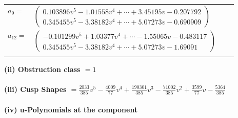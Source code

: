 \documentclass[1p]{elsarticle_modified}
\theoremstyle{definition}
\begin{document}
\begin{tabular}{m{7pt} m{180pt} m{7pt} m{180pt} }
\flushright $a_{9}=$&$\begin{pmatrix}0.103896 v^{5}-1.01558 v^{4}+\cdots+3.45195 v-0.207792\\0.345455 v^{5}-3.38182 v^{4}+\cdots+5.07273 v-0.690909\end{pmatrix}$ \\
\flushright $a_{12}=$&$\begin{pmatrix}-0.101299 v^{5}+1.03377 v^{4}+\cdots-1.55065 v-0.483117\\0.345455 v^{5}-3.38182 v^{4}+\cdots+5.07273 v-1.69091\end{pmatrix}$\\&\end{tabular}
\flushleft \textbf{(ii) Obstruction class $= 1$}\\~\\
\flushleft \textbf{(iii) Cusp Shapes $= \frac{2033}{385} v^5-\frac{4009}{77} v^4+\frac{190301}{385} v^3-\frac{71002}{385} v^2+\frac{3599}{77} v-\frac{5364}{385}$}\\~\\
\newpage\renewcommand{\arraystretch}{1}
\flushleft \textbf{(iv) u-Polynomials at the component}\newline \\
\end{document}

